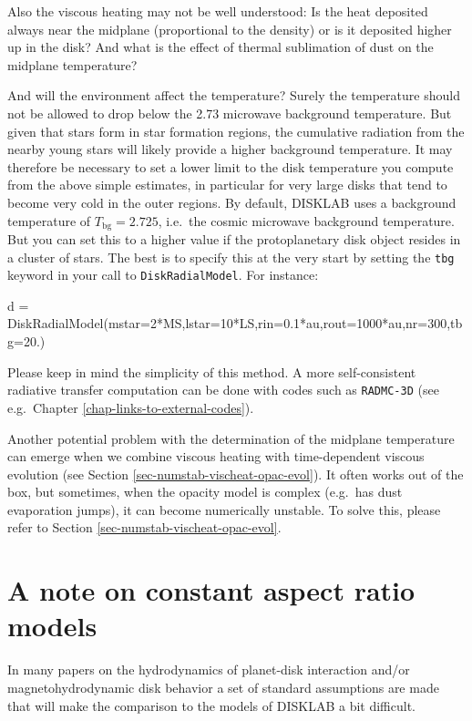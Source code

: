 \documentclass{book}
\newcommand{\code}[1]{{\small\tt #1}}
\begin{document}
Also the viscous heating may not be well understood: Is the heat deposited
always near the midplane (proportional to the density) or is it deposited higher
up in the disk?  And what is the effect of thermal sublimation of dust on the
midplane temperature?

And will the environment affect the temperature? Surely the temperature should
not be allowed to drop below the 2.73 microwave background temperature. But given
that stars form in star formation regions, the cumulative radiation from the
nearby young stars will likely provide a higher background temperature. It may
therefore be necessary to set a lower limit to the disk temperature you compute
from the above simple estimates, in particular for very large disks that tend to
become very cold in the outer regions. By default, {\sf DISKLAB} uses
a background temperature of $T_{\mathrm{bg}}=2.725$, i.e.\ the cosmic
microwave background temperature. But you can set this to a higher value
if the protoplanetary disk object resides in a cluster of stars. The best
is to specify this at the very start by setting the \code{tbg} keyword
in your call to \code{DiskRadialModel}. For instance:
\begin{codebox}
d = DiskRadialModel(mstar=2*MS,lstar=10*LS,rin=0.1*au,rout=1000*au,nr=300,tbg=20.)
\end{codebox}
Please keep in mind the simplicity of this method. A more self-consistent radiative
transfer computation can be done with codes such as \code{RADMC-3D} (see e.g.~Chapter
\ref{chap-links-to-external-codes}).

Another potential problem with the determination of the midplane temperature
can emerge when we combine viscous heating with time-dependent viscous
evolution (see Section \ref{sec-numstab-vischeat-opac-evol}). It often
works out of the box, but sometimes, when the opacity model is complex
(e.g.\ has dust evaporation jumps), it can become numerically unstable.
To solve this, please refer to Section \ref{sec-numstab-vischeat-opac-evol}.

\section{A note on constant aspect ratio models}
In many papers on the hydrodynamics of planet-disk interaction and/or
magnetohydrodynamic disk behavior a set of standard assumptions are made that
will make the comparison to the models of {\sf DISKLAB} a bit difficult.
\end{document}
